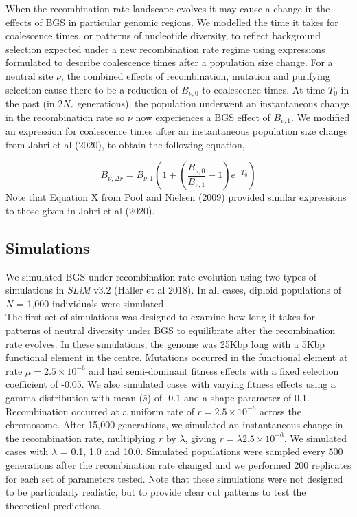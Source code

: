 \documentclass[10pt,twoside, twocolumn]{GSA_format}
\begin{document}
When the recombination rate landscape evolves it may cause a change in the effects of BGS in particular genomic regions. We modelled the time it takes for coalescence times, or patterns of nucleotide diversity, to reflect background selection expected under a new recombination rate regime using expressions formulated to describe coalescence times after a population size change. For a neutral site $\nu$, the combined effects of recombination, mutation and purifying selection cause there to be a reduction of $B_{\nu,0}$ to coalescence times. At time $T_0$ in the past (in $2N_e$ generations), the population underwent an instantaneous change in the recombination rate so $\nu$ now experiences a BGS effect of $B_{\nu,1}$. We modified an expression for coalescence times after an instantaneous population size change from Johri et al (2020), to obtain the following equation,

\begin{equation}
B_{\nu,\Delta r} = B_{\nu,1} ( 1 + (\frac{B_{\nu,0}}{B_{\nu,1}} - 1)e^{-T_0})
\label{BGS_rec}
\end{equation}
\noindent
Note that Equation X from Pool and Nielsen (2009) provided similar expressions to those given in Johri et al (2020). 


\subsection{Simulations}

We simulated BGS under recombination rate evolution using two types of simulations in \textit{SLiM} v3.2 (Haller et al 2018). In all cases, diploid populations of $N$ = 1,000 individuals were simulated. \\

The first set of simulations was designed to examine how long it takes for patterns of neutral diversity under BGS to equilibrate after the recombination rate evolves. In these simulations, the genome was 25Kbp long with a 5Kbp functional element in the centre. Mutations occurred in the functional element at rate $\mu = 2.5\times10^{-6}$ and had semi-dominant fitness effects with a fixed selection coefficient of -0.05. We also simulated cases with varying fitness effects using a gamma distribution with mean ($\bar{s}$) of -0.1 and a shape parameter of 0.1. Recombination occurred at a uniform rate of $r = 2.5\times10^{-6}$ across the chromosome. After 15,000 generations, we simulated an instantaneous change in the recombination rate, multiplying $r$ by $\lambda$, giving $r = \lambda2.5\times10^{-6}$. We simulated cases with $\lambda$ = 0.1, 1.0 and 10.0. Simulated populations were sampled every 500 generations after the recombination rate changed and we performed 200 replicates for each set of parameters tested. Note that these simulations were not designed to be particularly realistic, but to provide clear cut patterns to test the theoretical predictions. \\
\end{document}
